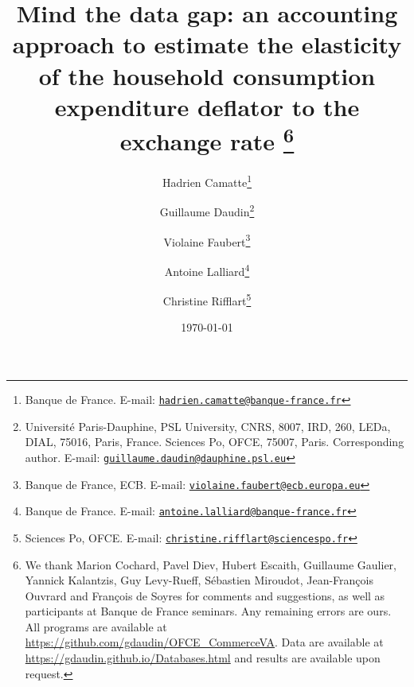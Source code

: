 \documentclass[12pt,a4paper]{paper}
\newcommand{\email}[1]{\href{mailto:#1}{\nolinkurl{#1}}}
\begin{document}
\title{Mind the data gap: an accounting approach to estimate the elasticity of the household consumption expenditure deflator to the exchange rate	\thanks{We thank Marion Cochard, Pavel Diev, Hubert Escaith, Guillaume Gaulier, Yannick Kalantzis, Guy Levy-Rueff, Sébastien Miroudot, Jean-François Ouvrard and François de Soyres for comments and suggestions, as well as participants at Banque de France seminars. Any remaining errors are ours. All programs are available at \url{https://github.com/gdaudin/OFCE_CommerceVA}. Data are available at \url{https://gdaudin.github.io/Databases.html} and results are available upon request.}\\
\vspace{1cm}
}
\vspace{1cm}
\date{\today}
\author{
	Hadrien Camatte\thanks{Banque de France. E-mail: \email{hadrien.camatte@banque-france.fr}}
	\and
	Guillaume Daudin\thanks{Université Paris-Dauphine, PSL University, CNRS, 8007, IRD, 260, LEDa, DIAL, 75016, Paris, France. Sciences Po, OFCE, 75007, Paris. Corresponding author. E-mail: \email{guillaume.daudin@dauphine.psl.eu}}
	\and
	Violaine Faubert\thanks{Banque de France, ECB. E-mail: \email{violaine.faubert@ecb.europa.eu}}
	\and
	Antoine Lalliard\thanks{Banque de France. E-mail: \email{antoine.lalliard@banque-france.fr}}
	\and
	Christine Rifflart\thanks{Sciences Po, OFCE. E-mail: \email{christine.rifflart@sciencespo.fr}}
}
\maketitle
\end{document}
